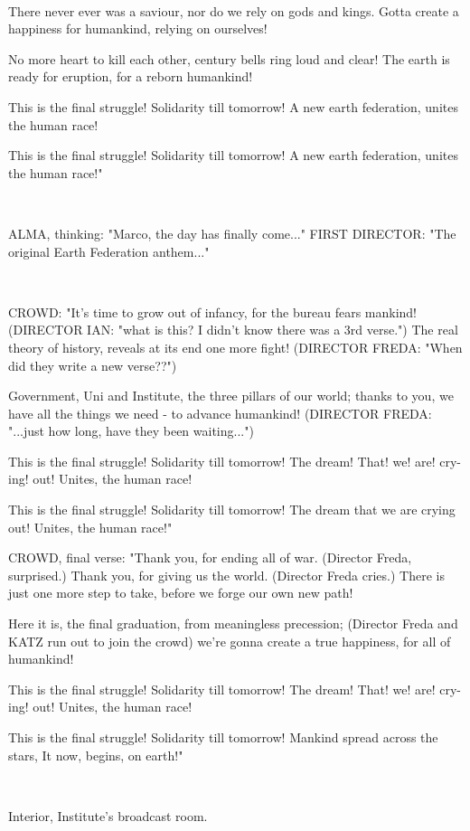 \documentclass[11pt]{article}
\begin{document}
\ 

There never ever was a saviour,
nor do we rely on gods and kings.
Gotta create a happiness for humankind,
relying on ourselves!

No more heart to kill each other,
century bells ring loud and clear!
The earth is ready for eruption,
for a reborn humankind!

This is the final struggle! 
Solidarity till tomorrow!
A new earth federation,
unites the human race! 

This is the final struggle!
Solidarity till tomorrow!
A new earth federation,
unites the human race!"

\ 

ALMA, thinking: "Marco, the day has finally come..."
FIRST DIRECTOR: "The original Earth Federation anthem..."

\ 

CROWD: "It's time to grow out of infancy,
for the bureau fears mankind! (DIRECTOR IAN: "what is this? I didn't know there was a 3rd verse.")
The real theory of history, 
reveals at its end one more fight! (DIRECTOR FREDA: "When did they write a new verse??")

Government, Uni and Institute, 
the three pillars of our world;
thanks to you, we have all the things we need - 
to advance humankind! (DIRECTOR FREDA: "...just how long, have they been waiting...")

This is the final struggle!
Solidarity till tomorrow!
The dream! That! we! are! cry-ing! out!
Unites, the human race!

This is the final struggle!
Solidarity till tomorrow!
The dream that we are crying out!
Unites, the human race!"

CROWD, final verse: "Thank you, for ending all of war. (Director Freda, surprised.) Thank you, for giving us the world. (Director Freda cries.) There is just one more step to take, before we forge our own new path!

Here it is, the final graduation, from meaningless precession; (Director Freda and KATZ run out to join the crowd) we're gonna create a true happiness, for all of humankind!

This is the final struggle!
Solidarity till tomorrow!
The dream! That! we! are! cry-ing! out!
Unites, the human race!

This is the final struggle!
Solidarity till tomorrow!
Mankind spread across the stars,
It now, begins, on earth!"

\ 

Interior, Institute's broadcast room.
\end{document}
